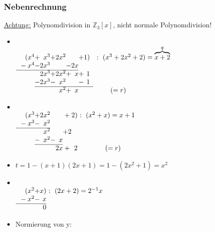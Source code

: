 \documentclass[a4paper, 12pt,titlepage, pdf, headsepline]{scrartcl}
\newcommand{\uline}[1]{\underline{#1}}
\renewcommand{\>}{\rightarrow}
\renewcommand{\*}{\cdot}
\begin{document}
		      	\subsubsection*{Nebenrechnung} \uline{Achtung:} Polynomdivision in $\mathds{Z}_3[x]$, nicht normale Polynomdivision!\\
		      	\begin{itemize}
		      		\item ~\\
		      		      $\begin{array}{r@{}c@{}r@{}c@{}r@{}c@{}r@{}c@{}rl}
		      		      	(x^4 & + & x^3 & + & 2x^2 &   &   & + & 1) & :  ~ (x^3+2x^2+2) = \overbrace{x+2}^{q} \\
		      		      	{}-x^4 &- & 2x^3 &  & &-&2x \\ \cline{1-7} 
		      		      	&  & 2x^3 & + & 2x^2 & + & x&+&1 \\
		      		      	&- &2x^3 & - & x^2 &  & &-&1 \\ \cline{2-9}
		      		      	     &   &     &   & x^2  & + & x &   &    & \qquad (=r)                             
		      		      \end{array}$
		      		\item ~\\
		      		      $\begin{array}{r@{}c@{}r@{}c@{}r@{}c@{}r@{}c@{}rl}
		      		      	(x^3 & + & 2x^2 &   &    & + & 2) & ~ :  ~ (x^2+x) =x+1 \\
		      		      	{}-x^3&-&x^2\\ \cline{1-3}
		      		      	&&x^2&&&+2\\
		      		      	&-&x^2&-&x\\\cline{2-5}
		      		      	     &   &      &   & 2x & + & 2  & \qquad (=r)         
		      		      \end{array}$
		      		\item $ t = 1-(x+1)(2x+1) = 1-(2x^2 + 1) = x^2$ \\
		      		\item ~\\
		      		      $\begin{array}{r@{}c@{}r@{}c@{}r@{}c@{}r@{}c@{}rl}
		      		      	(x^2 & + & x) & ~ :  ~ (2x+2) =2^{-1}x \\
		      		      	{}-x^2&-&x\\ \cline{1-3}
		      		      	&&0
		      		      \end{array}$
		      		\item Normierung von y: \\

\end{itemize}
\end{document}
